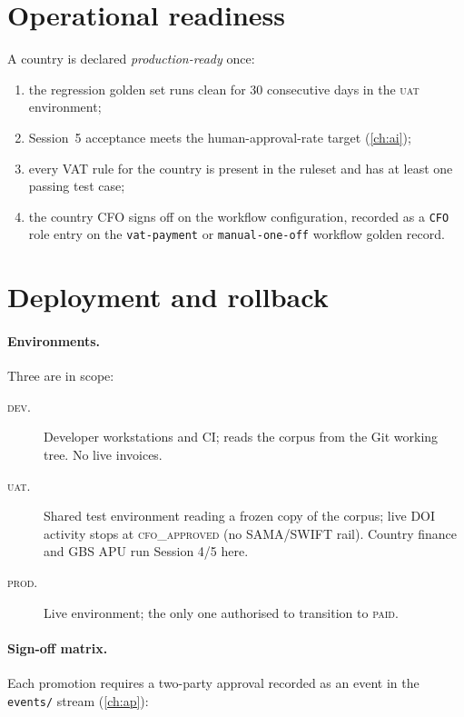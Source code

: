 \section{Operational readiness}

A country is declared \emph{production-ready} once:
\begin{enumerate}
  \item the regression golden set runs clean for 30 consecutive days
        in the \textsc{uat} environment;
  \item Session~5 acceptance meets the human-approval-rate target
        (\cref{ch:ai});
  \item every VAT rule for the country is present in the ruleset and
        has at least one passing test case;
  \item the country CFO signs off on the workflow configuration,
        recorded as a \texttt{CFO} role entry on the \texttt{vat-payment}
        or \texttt{manual-one-off} workflow golden record.
\end{enumerate}

\section{Deployment and rollback}

\paragraph{Environments.} Three are in scope:
\begin{description}
  \item[\textsc{dev}.] Developer workstations and CI; reads the corpus
        from the Git working tree. No live invoices.
  \item[\textsc{uat}.] Shared test environment reading a frozen copy of
        the corpus; live DOI activity stops at \textsc{cfo\_approved}
        (no SAMA/SWIFT rail). Country finance and GBS APU run Session
        4/5 here.
  \item[\textsc{prod}.] Live environment; the only one authorised to
        transition to \textsc{paid}.
\end{description}

\paragraph{Sign-off matrix.} Each promotion requires a two-party
approval recorded as an event in the \texttt{events/} stream
(\cref{ch:ap}):

